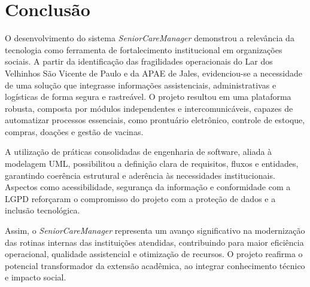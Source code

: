 \chapter{Conclusão}

O desenvolvimento do sistema \textit{SeniorCareManager} demonstrou a relevância da tecnologia como ferramenta de fortalecimento institucional em organizações sociais. A partir da identificação das fragilidades operacionais do Lar dos Velhinhos São Vicente de Paulo e da APAE de Jales, evidenciou-se a necessidade de uma solução que integrasse informações assistenciais, administrativas e logísticas de forma segura e rastreável. O projeto resultou em uma plataforma robusta, composta por módulos independentes e intercomunicáveis, capazes de automatizar processos essenciais, como prontuário eletrônico, controle de estoque, compras, doações e gestão de vacinas.

A utilização de práticas consolidadas de engenharia de software, aliada à modelagem UML, possibilitou a definição clara de requisitos, fluxos e entidades, garantindo coerência estrutural e aderência às necessidades institucionais. Aspectos como acessibilidade, segurança da informação e conformidade com a LGPD reforçaram o compromisso do projeto com a proteção de dados e a inclusão tecnológica.

Assim, o \textit{SeniorCareManager} representa um avanço significativo na modernização das rotinas internas das instituições atendidas, contribuindo para maior eficiência operacional, qualidade assistencial e otimização de recursos. O projeto reafirma o potencial transformador da extensão acadêmica, ao integrar conhecimento técnico e impacto social.

